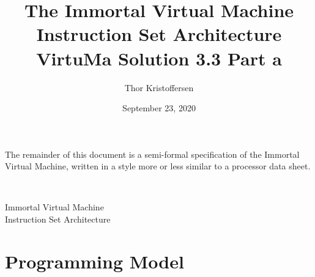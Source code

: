 \documentclass[a4paper,10pt]{article}
\author{Thor Kristoffersen}
\date{September 23, 2020}
\title{The Immortal Virtual Machine\\Instruction Set Architecture\\
  \vspace{1ex}
  \large VirtuMa Solution 3.3 Part a}
\theoremstyle{definition}
\begin{document}
\maketitle

\noindent
The remainder of this document is a semi-formal specification of the Immortal Virtual Machine, written in a style more or less similar to a processor data sheet.

\thispagestyle{empty}
\newpage

~
\thispagestyle{empty}
\newpage
\setcounter{page}{1}

\begin{center}
  \Large{Immortal Virtual Machine\\Instruction Set Architecture}
\end{center}
\vspace{1em}

\section{Programming Model}
\label{sec:programming-model}
\end{document}
